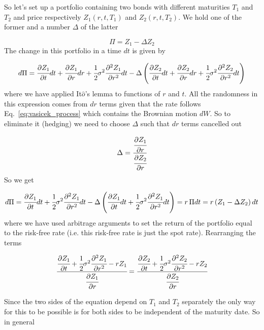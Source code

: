 So let's set up a portfolio containing two bonds with different maturities $T_1$ and $T_2$ and price respectively $Z_1(r, t, T_1)$
and $Z_2(r, t, T_2)$. We hold one of the former and a number $\Delta$ of the latter

\begin{equation*}
\Pi = Z_1-\Delta Z_2
\end{equation*}
The change in this portfolio in a time $dt$ is given by

\begin{equation*}
d\Pi = \cfrac{\partial Z_1}{\partial t}dt + \cfrac{\partial Z_1}{\partial r}dr + \cfrac{1}{2}\sigma^2 \cfrac{\partial^2 Z_1}{\partial r^2}dt - \Delta\left(\cfrac{\partial Z_2}{\partial t}dt + \cfrac{\partial Z_2}{\partial r}dr + \cfrac{1}{2}\sigma^2 \cfrac{\partial^2 Z_2}{\partial r^2}dt\right)
\end{equation*}
where we have applied It$\hat{o}$'s lemma to functions of $r$ and $t$. All the randomness in this expression comes from $dr$ terms given that the rate follows Eq.~\ref{eq:vasicek_process} which contains the Brownian motion $dW$. So to eliminate it (hedging) we need to choose $\Delta$ such that $dr$ terms cancelled out

\begin{equation*}
\Delta = \cfrac{\cfrac{\partial Z_1}{\partial r}}{\cfrac{\partial Z_2}{\partial r}}
\end{equation*}
So we get

\begin{equation*}
d\Pi = \cfrac{\partial Z_1}{\partial t}dt + \cfrac{1}{2}\sigma^2 \cfrac{\partial^2 Z_1}{\partial r^2}dt - \Delta\left(\cfrac{\partial Z_1}{\partial t}dt + \cfrac{1}{2}\sigma^2 \cfrac{\partial^2 Z_1}{\partial r^2}dt\right) = r\, \Pi dt = r \left(Z_1 - \Delta Z_2\right)dt
\end{equation*}
where we have used arbitrage arguments to set the return of the portfolio equal to the risk-free rate (i.e. this risk-free rate is just the spot rate). Rearranging the terms

\begin{equation*}
\cfrac{\cfrac{\partial Z_1}{\partial t} + \cfrac{1}{2}\sigma^2 \cfrac{\partial^2 Z_1}{\partial r^2} - rZ_1}{\cfrac{\partial Z_1}{\partial r}}=\cfrac{\cfrac{\partial Z_2}{\partial t} + \cfrac{1}{2}\sigma^2 \cfrac{\partial^2 Z_2}{\partial r^2} - rZ_2}{\cfrac{\partial Z_2}{\partial r}}
\end{equation*}

Since the two sides of the equation depend on $T_1$ and $T_2$ separately the only way for this to be possible is for both sides to be independent of the maturity date. So in general

